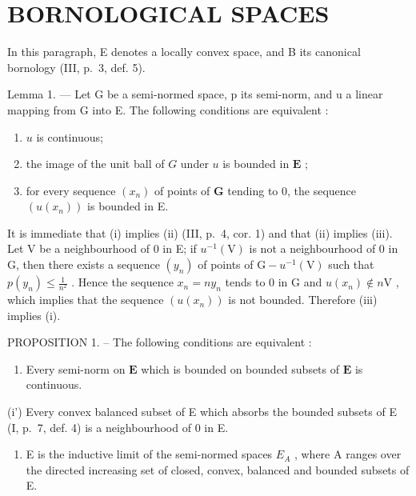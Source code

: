 \section{BORNOLOGICAL SPACES}

In this paragraph, E denotes a locally convex space, and B its canonical bornology (III, p.~3, def. 5).

Lemma 1. --- Let G be a semi-normed space, p its semi-norm, and u a linear mapping from G into E. The following conditions are equivalent :

\begin{enumerate}
\def\labelenumi{(\roman{enumi})}
\item
  \(u\) is continuous;
\item
  the image of the unit ball of \(G\) under \(u\) is bounded in \(\mathbf{E}\) ;
\item
  for every sequence \((x_{n})\) of points of \(\mathbf{G}\) tending to 0, the sequence \((u(x_{n}))\) is bounded in E.
\end{enumerate}

It is immediate that (i) implies (ii) (III, p.~4, cor. 1) and that (ii) implies (iii). Let V be a neighbourhood of 0 in E; if \(u^{-1}(\mathrm{V})\) is not a neighbourhood of 0 in G, then there exists a sequence \((y_n)\) of points of \(\mathrm{G} - u^{-1}(\mathrm{V})\) such that \(p(y_n) \leqslant \frac{1}{n^2}\) . Hence the sequence \(x_n = ny_n\) tends to 0 in G and \(u(x_n) \notin n\mathrm{V}\) , which implies that the sequence \((u(x_n))\) is not bounded. Therefore (iii) implies (i).

PROPOSITION 1. -- The following conditions are equivalent :

\begin{enumerate}
\def\labelenumi{(\roman{enumi})}
\tightlist
\item
  Every semi-norm on \(\mathbf{E}\) which is bounded on bounded subsets of \(\mathbf{E}\) is continuous.
\end{enumerate}

(i') Every convex balanced subset of E which absorbs the bounded subsets of E (I, p.~7, def. 4) is a neighbourhood of 0 in E.

\begin{enumerate}
\def\labelenumi{(\roman{enumi})}
\setcounter{enumi}{1}
\tightlist
\item
  E is the inductive limit of the semi-normed spaces \(E_{A}\) , where A ranges over the directed increasing set of closed, convex, balanced and bounded subsets of E.
\end{enumerate}

